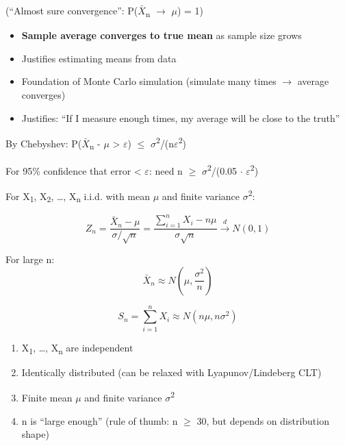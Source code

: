 (``Almost sure convergence'': P(\ensuremath{\bar{X}}\textsubscript{n} \ensuremath{\to} \ensuremath{\mu}) = 1)


\begin{itemize}
\tightlist
\item
  \textbf{Sample average converges to true mean} as sample size grows
\item
  Justifies estimating means from data
\item
  Foundation of Monte Carlo simulation (simulate many times \ensuremath{\to} average converges)
\item
  Justifies: ``If I measure enough times, my average will be close to the truth''
\end{itemize}


By Chebyshev: P(\textbar{}\ensuremath{\bar{X}}\textsubscript{n} - \ensuremath{\mu}\textbar{} \textgreater{} \ensuremath{\varepsilon}) \ensuremath{\le} \ensuremath{\sigma}\textsuperscript{2}/(n\ensuremath{\varepsilon}\textsuperscript{2})

For 95\% confidence that error \textless{} \ensuremath{\varepsilon}: need n \ensuremath{\ge} \ensuremath{\sigma}\textsuperscript{2}/(0.05 \ensuremath{\cdot} \ensuremath{\varepsilon}\textsuperscript{2})



For X\textsubscript{1}, X\textsubscript{2}, …, X\textsubscript{n} i.i.d. with mean \ensuremath{\mu} and finite variance \ensuremath{\sigma}\textsuperscript{2}:

\[Z_n = \frac{\bar{X}_n - \mu}{\sigma/\sqrt{n}} = \frac{\sum_{i=1}^n X_i - n\mu}{\sigma\sqrt{n}} \xrightarrow{d} N(0,1)\]


For large n:\PSbr{}\[\bar{X}_n \approx N\left(\mu, \frac{\sigma^2}{n}\right)\]

\[S_n = \sum_{i=1}^n X_i \approx N(n\mu, n\sigma^2)\]


\begin{enumerate}
\def\labelenumi{\arabic{enumi}.}
\tightlist
\item
  X\textsubscript{1}, …, X\textsubscript{n} are independent
\item
  Identically distributed (can be relaxed with Lyapunov/Lindeberg CLT)
\item
  Finite mean \ensuremath{\mu} and finite variance \ensuremath{\sigma}\textsuperscript{2}
\item
  n is ``large enough'' (rule of thumb: n \ensuremath{\ge} 30, but depends on distribution shape)
\end{enumerate}


